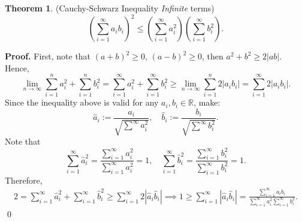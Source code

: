 \documentclass[11pt]{article}
\theoremstyle{definition}
\newenvironment{prf}[1][Proof]{\textbf{#1.} }{\qed}
\newtheorem{theorem}{Theorem}[section]
\begin{document}
\newpage
\begin{theorem}{(Cauchy-Schwarz Inequality \textit{Infinite} terms)}
   \begin{equation}
    \left( 
        \sum^{\infty}_{i=1} a_i b_i
    \right) ^2
    \leq
    \left( 
        \sum^{\infty}_{i=1}a_i^2
    \right)
    \left( 
    \sum^{\infty}_{i=1}b_i^2
    \right).
   \end{equation}
   \label{CSi}
\end{theorem}

\begin{shaded}
\begin{prf}
    First, note that $(a+b)^2 \geq 0$, $(a-b)^2 \geq 0$, then
    $a^2 + b^2 \geq 2 |ab|$. Hence,
    \begin{equation*}
        \lim_{n\to \infty}
        \sum^n_{i=1} a_i ^2 +
        \sum^n_{i=1} b_i ^2
         = 
        \sum^{\infty}_{i=1} a_i ^2  
        +
        \sum^{\infty}_{i=1} b_i ^2
        \geq
        \lim_{n\to \infty}
        \sum^n_{i=1}2|a_i b_i| =
        \sum^{\infty}_{i=1} 2 |a_ib_i|.
    \end{equation*}
    Since the inequality above is valid for any $a_i,b_i \in \mathbb R$,
    make:
    \begin{equation*}
        \hat a_i := \frac{a_i}{\sqrt{\sum^{\infty}a_i^2}} ,\quad
        \hat b_i := \frac{b_i}{\sqrt{\sum^{\infty}b_i^2}}.
    \end{equation*}
    Note that
    \begin{equation*}
    \sum^{\infty}_{i=1} \hat a_i ^2 = 
    \frac{\sum^{\infty}_{i=1} a_i ^2}{\sum^{\infty}_{i=1} a_i ^2} = 1
    , \quad
    \sum^{\infty}_{i=1} \hat b_i ^2 = 
    \frac{\sum^{\infty}_{i=1} b_i ^2}{\sum^{\infty}_{i=1} b_i ^2} = 1.
    \end{equation*}
    Therefore,
    \begin{align*}
        2 =
        \sum^{\infty}_{i=1} \hat a_i ^2  
        +
        \sum^{\infty}_{i=1} \hat b_i ^2
        \geq
        \sum^{\infty}_{i=1} 2 |\hat a_i \hat b_i|
        \implies
        1 \geq 
        \sum^{\infty}_{i=1} |\hat a_i \hat b_i|
        = 
        \frac{\sum^{\infty}_{i=1} a_i b_i}
        {\sum^{\infty}_{i=1}a_i^2
        \sum^{\infty}_{i=1}b_i^2}.
    \end{align*}
\end{prf}
\end{shaded}
\end{document}

